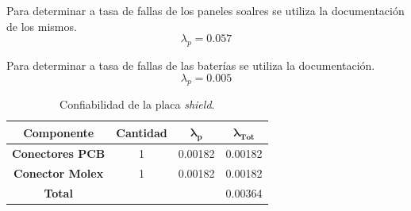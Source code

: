 Para determinar a tasa de fallas de los paneles soalres se utiliza la documentación de los mismos.
\begin{equation}
\lambda_p = 0.057 
\end{equation}

Para determinar a tasa de fallas de las baterías se utiliza la documentación.
\begin{equation}
\lambda_p = 0.005 
\end{equation}
\begin{table}[H]
\centering
\begin{tabular}{|c|ccc|}
\hline
\textbf{Componente}     & \multicolumn{1}{c|}{\textbf{Cantidad}} & \multicolumn{1}{c|}{$\boldsymbol{\lambda_p}$}        & $\boldsymbol{\lambda_{Tot}}$ \\ \hline
\textbf{Conectores PCB} & \multicolumn{1}{c|}{1}                 & \multicolumn{1}{c|}{\cellcolor[HTML]{FFFFFF}0.00182} & 0.00182                      \\ \hline
\textbf{Conector Molex} & \multicolumn{1}{c|}{1}                 & \multicolumn{1}{c|}{\cellcolor[HTML]{FFFFFF}0.00182} & 0.00182                      \\ \hline
\textbf{Total}          & \multicolumn{1}{l}{}                   & \multicolumn{1}{l}{\cellcolor[HTML]{FFFFFF}}         & \multicolumn{1}{r|}{0.00364} \\ \hline
\end{tabular}
\caption{Confiabilidad de la placa \textit{shield}.}
\label{confshield}
\end{table}

